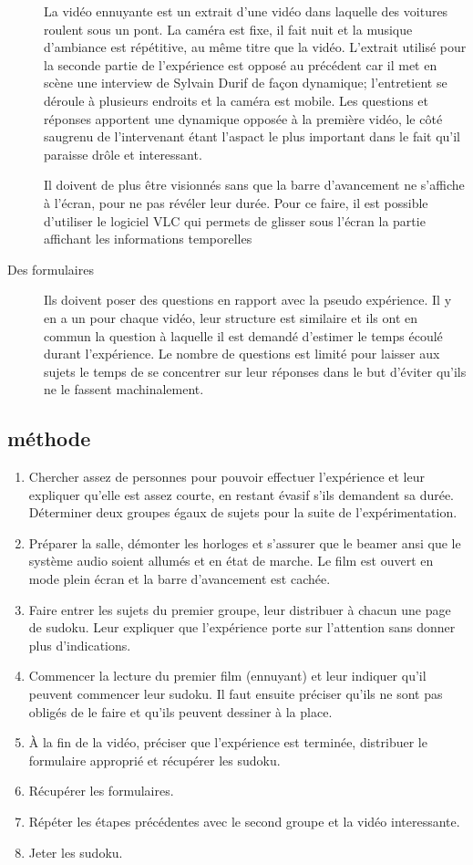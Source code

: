 \documentclass[12pt,fleqn,oneside,openany]{book} %
\begin{document}
\begin{description}
	La vidéo ennuyante est un extrait d'une vidéo dans laquelle des voitures roulent sous un pont. La caméra est fixe, il fait nuit et la musique d'ambiance est répétitive, au même titre que la vidéo. L'extrait utilisé pour la seconde partie de l'expérience est opposé au précédent car il met en scène une interview de Sylvain Durif de façon dynamique; l'entretient se déroule à plusieurs endroits et la caméra est mobile. Les questions et réponses apportent une dynamique opposée à la première vidéo, le côté saugrenu de l'intervenant étant l'aspact le plus important dans le fait qu'il paraisse drôle et interessant. 

	Il doivent de plus être visionnés sans que la barre d'avancement ne s'affiche à l'écran, pour ne pas révéler leur durée. Pour ce faire, il est possible d'utiliser le logiciel VLC qui permets de glisser sous l'écran la partie affichant les informations temporelles
	\item[Des formulaires] Ils doivent poser des questions en rapport avec la pseudo expérience. Il y en a un pour chaque vidéo, leur structure est similaire et ils ont en commun la question à laquelle il est demandé d'estimer le temps écoulé durant l'expérience. Le nombre de questions est limité pour laisser aux sujets le temps de se concentrer sur leur réponses dans le but d'éviter qu'ils ne le fassent machinalement.
\end{description}

\subsection{méthode} \label{ssec:methode}
\begin{enumerate}
	\item Chercher assez de personnes pour pouvoir effectuer l'expérience et leur expliquer qu'elle est assez courte, en restant évasif s'ils demandent sa durée. Déterminer deux groupes égaux de sujets pour la suite de l'expérimentation.
	\item Préparer la salle, démonter les horloges et s'assurer que le beamer ansi que le système audio soient allumés et en état de marche. Le film est ouvert en mode plein écran et la barre d'avancement est cachée.
	\item Faire entrer les sujets du premier groupe, leur distribuer à chacun une page de sudoku. Leur expliquer que l'expérience porte sur l'attention sans donner plus d'indications. 
	\item Commencer la lecture du premier film (ennuyant) et leur indiquer qu'il peuvent commencer leur sudoku. Il faut ensuite préciser qu'ils ne sont pas obligés de le faire et qu'ils peuvent dessiner à la place. 
	\item À la fin de la vidéo, préciser que l'expérience est terminée, distribuer le formulaire approprié et récupérer les sudoku.
	\item Récupérer les formulaires.
	\item Répéter les étapes précédentes avec le second groupe et la vidéo interessante.
	\item Jeter les sudoku.
\end{enumerate}
\end{document}
